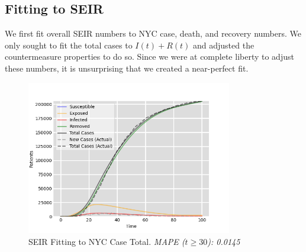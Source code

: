 \documentclass[12pt, a4, epsf] {article}
\theoremstyle{plain}
\theoremstyle{definition}
\begin{document}
\subsection{Fitting to SEIR}
We first fit overall SEIR numbers to NYC case, death, and recovery numbers. We only sought to fit the total cases to $I(t) + R(t)$ and adjusted the countermeasure properties to do so. Since we were at complete liberty to adjust these numbers, it is unsurprising that we created a near-perfect fit.\\
\begin{figure}[htbp]
\includegraphics[width = 0.8\textwidth]{Scratch_Visuals/SEIR_Curve_NYC_3.png}
\caption{SEIR Fitting to NYC Case Total. \textit{MAPE ($t \geq 30$): 0.0145}}
\end{figure}
\FloatBarrier
\end{document}
